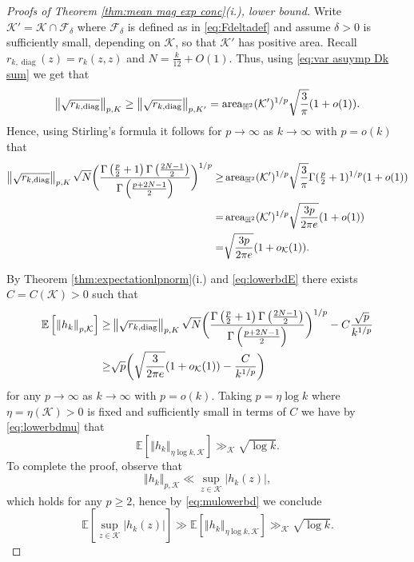 \documentclass[12pt, a4paper]{amsart}
\newcommand{\tmop}[1]{\ensuremath{\operatorname{#1}}}
\theoremstyle{definition}
\newcommand {\1} {\mathbf{1}}
\newcommand {\Kc} {\mathcal{K}}
\numberwithin{equation}{section}
\begin{document}
\begin{proof}[Proofs of Theorem \ref{thm:mean mag exp conc}(i.), lower bound]
Write $\Kc'=\Kc \cap \mathcal F_{\delta}$ where $\mathcal F_{\delta}$ is defined as in \eqref{eq:Fdeltadef} and assume $\delta>0$ is sufficiently small, depending on $\Kc$, so that $\Kc'$ has positive area. Recall $r_{k,\tmop{diag}}(z)=r_k(z,z)$ and $N=\frac{k}{12}+O(1)$. Thus, using \eqref{eq:var asuymp Dk sum} we get that
\[
 \left\Vert \sqrt{r_{k,\tmop{diag}}} \right\Vert_{p,\mathcal \Kc} \ge  \left\Vert \sqrt{r_{k,\tmop{diag}}} \right\Vert_{p,\mathcal \Kc'} = \tmop{area}_{\mathbb H^2}(\Kc')^{1/p} \sqrt{\frac{3}{\pi}}(1+o(1)).
\]
Hence, using Stirling's formula it follows for $ p \rightarrow \infty$ as $k \rightarrow \infty$ with $p =o(k)$ that
\begin{equation} \label{eq:lowerbdE}
\begin{split}
\left\Vert \sqrt{r_{k,\tmop{diag}}} \right\Vert_{p,\mathcal \Kc} \sqrt{N}\bigg(\frac{\Gamma\left(\frac{p}{2}+1\right)\Gamma\left(\frac{2N-1}{2}\right)}{\Gamma\left(\frac{p+2N-1}{2}\right)} \bigg)^{1/p} 
\ge & \tmop{area}_{\mathbb H^2}(\Kc')^{1/p} \sqrt{\frac{3}{\pi}}  \Gamma(\tfrac{p}{2}+1)^{1/p}(1+o(1)) \\
=&\tmop{area}_{\mathbb H^2}(\Kc')^{1/p} \sqrt{\frac{3p}{2\pi e}}(1+o(1)) \\
=& \sqrt{\frac{3p}{2\pi e}} (1+o_{\Kc}(1)) .
\end{split}
\end{equation}


By Theorem \ref{thm:expectationlpnorm}(i.) and \eqref{eq:lowerbdE} there exists $C=C(\Kc)>0$ such that
\begin{equation} \label{eq:lowerbdmu}
\begin{split}
\mathbb E\left[ \left\Vert h_k \right\Vert_{p,\Kc} \right]  \ge &\left\Vert \sqrt{r_{k,\tmop{diag}}} \right\Vert_{p,\mathcal \Kc} \sqrt{N}\bigg(\frac{\Gamma\left(\frac{p}{2}+1\right)\Gamma\left(\frac{2N-1}{2}\right)}{\Gamma\left(\frac{p+2N-1}{2}\right)} \bigg)^{1/p}- C \frac{\sqrt{p}}{k^{1/p}} \\
\ge & \sqrt{p}\bigg(\sqrt{\frac{3}{2\pi e}}(1+o_{\Kc}(1))-\frac{C}{k^{1/p}} \bigg)
\end{split}
\end{equation}
for any $p  \rightarrow \infty$ as $k \rightarrow \infty$ with $p=o(k)$.
Taking $p=\eta \log k$ where $\eta=\eta(\Kc)>0$ is fixed and sufficiently small in terms of $C$ we have by \eqref{eq:lowerbdmu} that
\begin{equation} \label{eq:mulowerbd}
\mathbb E\left[ \left\Vert h_k \right\Vert_{\eta \log k,\Kc} \right] \gg_{\Kc} \sqrt{\log k}.
\end{equation}
 To complete the proof, observe that
\[
 \left\Vert h_{k}\right\Vert _{p,\Kc} \ll \sup_{z \in \Kc} |h_k(z)|,
\]
which holds for any $p\ge 2$, hence by \eqref{eq:mulowerbd} we conclude
\[
\mathbb E\left[ \sup_{z \in \Kc} |h_k(z)| \right] \gg  \mathbb E \left[ \left\Vert h_{k}\right\Vert _{\eta \log k,\Kc} \right]\gg_{\Kc} \sqrt{\log k}.
\]\end{proof}
\end{document}
